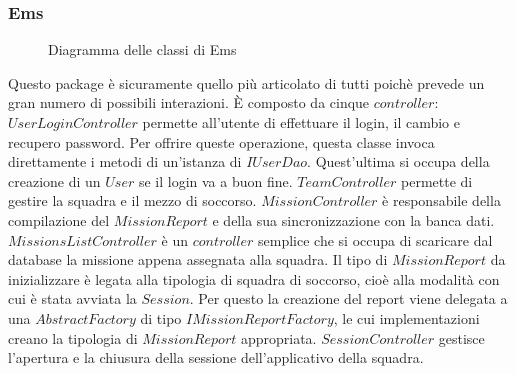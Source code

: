 \documentclass{article}
\begin{document}
    \subsubsection{Ems}
    \begin{figure}
        \centering
        
        \caption{Diagramma delle classi di Ems}
        \label{fig:uml-ems}
    \end{figure}
    Questo package è sicuramente quello più articolato di tutti poichè prevede un gran numero di possibili interazioni.
    È composto da cinque $controller$:
    \newline $UserLoginController$ permette all'utente di effettuare il login, il cambio e recupero password.
    Per offrire queste operazione, questa classe invoca direttamente i metodi di un'istanza di $IUserDao$.
    Quest'ultima si occupa della creazione di un $User$ se il login va a buon fine.
    \newline $TeamController$ permette di gestire la squadra e il mezzo di soccorso.
    \newline $MissionController$ è responsabile della compilazione del $MissionReport$ e della sua sincronizzazione con la banca dati.
    \newline $MissionsListController$ è un $controller$ semplice che si occupa di scaricare dal database la missione appena assegnata alla squadra.
    Il tipo di $MissionReport$ da inizializzare è legata alla tipologia di squadra di soccorso, cioè alla modalità con cui è stata avviata la $Session$.
    Per questo la creazione del report viene delegata a una $AbstractFactory$ di tipo $IMissionReportFactory$, le cui implementazioni creano la tipologia di $MissionReport$ appropriata.
    \newline $SessionController$ gestisce l'apertura e la chiusura della sessione dell'applicativo della squadra.
\end{document}
